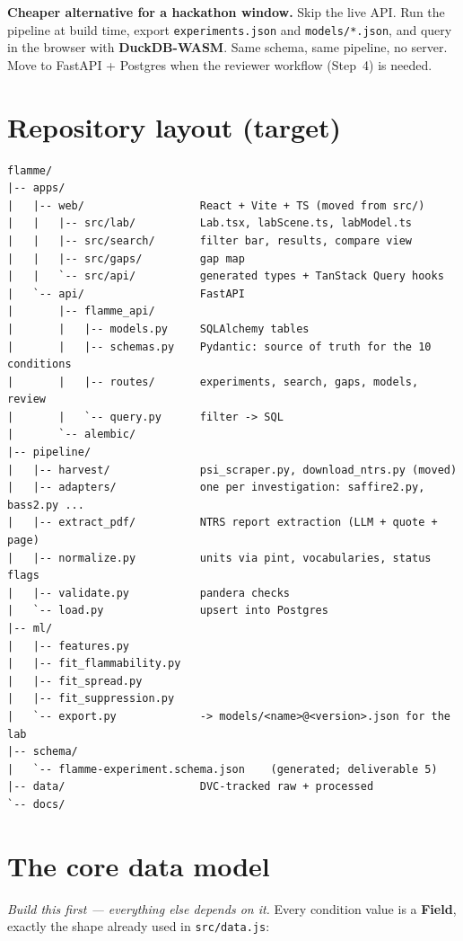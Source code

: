 \documentclass[11pt,a4paper]{article}
\newcommand{\code}[1]{\texttt{#1}}
\begin{document}
\begin{keybox}
\textbf{Cheaper alternative for a hackathon window.} Skip the live API. Run the pipeline at build time,
export \code{experiments.json} and \code{models/*.json}, and query in the browser with
\textbf{DuckDB-WASM}. Same schema, same pipeline, no server. Move to FastAPI + Postgres when
the reviewer workflow (Step~4) is needed.
\end{keybox}

\section{Repository layout (target)}

\begin{lstlisting}
flamme/
|-- apps/
|   |-- web/                  React + Vite + TS (moved from src/)
|   |   |-- src/lab/          Lab.tsx, labScene.ts, labModel.ts
|   |   |-- src/search/       filter bar, results, compare view
|   |   |-- src/gaps/         gap map
|   |   `-- src/api/          generated types + TanStack Query hooks
|   `-- api/                  FastAPI
|       |-- flamme_api/
|       |   |-- models.py     SQLAlchemy tables
|       |   |-- schemas.py    Pydantic: source of truth for the 10 conditions
|       |   |-- routes/       experiments, search, gaps, models, review
|       |   `-- query.py      filter -> SQL
|       `-- alembic/
|-- pipeline/
|   |-- harvest/              psi_scraper.py, download_ntrs.py (moved)
|   |-- adapters/             one per investigation: saffire2.py, bass2.py ...
|   |-- extract_pdf/          NTRS report extraction (LLM + quote + page)
|   |-- normalize.py          units via pint, vocabularies, status flags
|   |-- validate.py           pandera checks
|   `-- load.py               upsert into Postgres
|-- ml/
|   |-- features.py
|   |-- fit_flammability.py
|   |-- fit_spread.py
|   |-- fit_suppression.py
|   `-- export.py             -> models/<name>@<version>.json for the lab
|-- schema/
|   `-- flamme-experiment.schema.json    (generated; deliverable 5)
|-- data/                     DVC-tracked raw + processed
`-- docs/
\end{lstlisting}

\section{The core data model}

\emph{Build this first --- everything else depends on it.} Every condition value is a
\textbf{Field}, exactly the shape already used in \code{src/data.js}:
\end{document}
